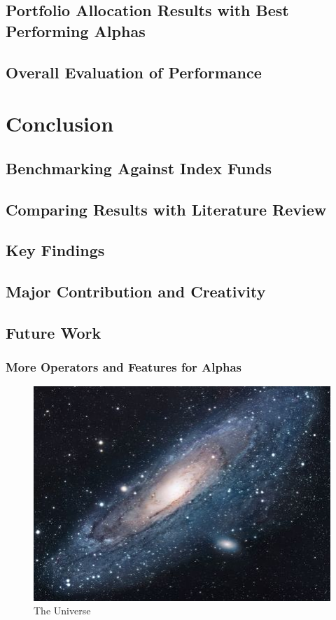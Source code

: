 \documentclass[a4paper,12pt]{report}
\numberwithin{equation}{section}
\theoremstyle{definition}
\begin{document}
\section{Portfolio Allocation Results with Best Performing Alphas}
\section{Overall Evaluation of Performance}


\chapter{Conclusion}
\section{Benchmarking Against Index Funds}
\section{Comparing Results with Literature Review}
\section{Key Findings}
\section{Major Contribution and Creativity}
\section{Future Work}
\subsection{More Operators and Features for Alphas}

\begin{figure}[h!]
\centering
\includegraphics[scale=1.7]{universe}
\caption{The Universe}
\label{fig:universe}
\end{figure}




\end{document}
